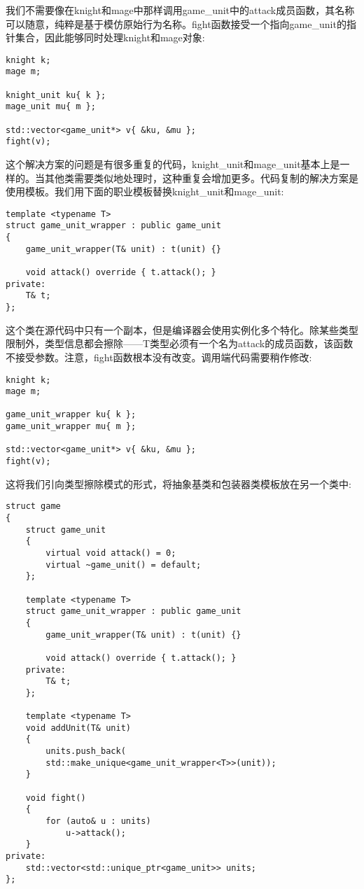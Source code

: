 我们不需要像在knight和mage中那样调用game\_unit中的attack成员函数，其名称可以随意，纯粹是基于模仿原始行为名称。fight函数接受一个指向game\_unit的指针集合，因此能够同时处理knight和mage对象:

\begin{lstlisting}[style=styleCXX]
knight k;
mage m;

knight_unit ku{ k };
mage_unit mu{ m };

std::vector<game_unit*> v{ &ku, &mu };
fight(v);
\end{lstlisting}

这个解决方案的问题是有很多重复的代码，knight\_unit和mage\_unit基本上是一样的。当其他类需要类似地处理时，这种重复会增加更多。代码复制的解决方案是使用模板。我们用下面的职业模板替换knight\_unit和mage\_unit:

\begin{lstlisting}[style=styleCXX]
template <typename T>
struct game_unit_wrapper : public game_unit
{
	game_unit_wrapper(T& unit) : t(unit) {}
	
	void attack() override { t.attack(); }
private:
	T& t;
};
\end{lstlisting}

这个类在源代码中只有一个副本，但是编译器会使用实例化多个特化。除某些类型限制外，类型信息都会擦除——T类型必须有一个名为attack的成员函数，该函数不接受参数。注意，fight函数根本没有改变。调用端代码需要稍作修改:

\begin{lstlisting}[style=styleCXX]
knight k;
mage m;

game_unit_wrapper ku{ k };
game_unit_wrapper mu{ m };

std::vector<game_unit*> v{ &ku, &mu };
fight(v);
\end{lstlisting}

这将我们引向类型擦除模式的形式，将抽象基类和包装器类模板放在另一个类中:

\begin{lstlisting}[style=styleCXX]
struct game
{
	struct game_unit
	{
		virtual void attack() = 0;
		virtual ~game_unit() = default;
	};

	template <typename T>
	struct game_unit_wrapper : public game_unit
	{
		game_unit_wrapper(T& unit) : t(unit) {}
		
		void attack() override { t.attack(); }
	private:
		T& t;
	};

	template <typename T>
	void addUnit(T& unit)
	{
		units.push_back(
		std::make_unique<game_unit_wrapper<T>>(unit));
	}

	void fight()
	{
		for (auto& u : units)
			u->attack();
	}
private:
	std::vector<std::unique_ptr<game_unit>> units;
};
\end{lstlisting}

